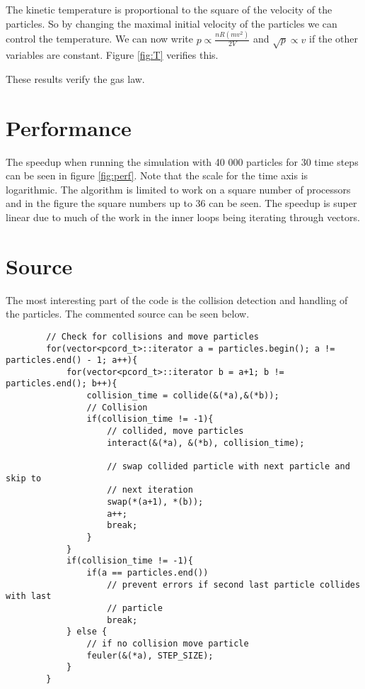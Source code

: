 \documentclass[a4paper, 12pt]{article}
\begin{document}
The kinetic temperature is proportional to the square of the velocity of the
particles. So by changing the maximal initial velocity of the particles we can
control the temperature. We can now write $p \propto \frac{nR(mv^2)}{2V}$ and
$\sqrt{p} \propto v$ if the other variables are constant. Figure \ref{fig:T}
verifies this.

These results verify the gas law.

\section{Performance}
The speedup when running the simulation with 40 000 particles for 30 time
steps can be seen in figure \ref{fig:perf}. Note that the scale for the time
axis is logarithmic. The algorithm is limited to work on a square
number of processors and in the figure the square numbers up to 36 can be seen.
The speedup is super linear due to much of the work in the inner loops being 
iterating through vectors.

\section{Source}
\label{sec:src}
The most interesting part of the code is the collision detection and handling of
the particles. The commented source can be seen below.
\begin{lstlisting}
        // Check for collisions and move particles
        for(vector<pcord_t>::iterator a = particles.begin(); a != particles.end() - 1; a++){
            for(vector<pcord_t>::iterator b = a+1; b != particles.end(); b++){
                collision_time = collide(&(*a),&(*b));
                // Collision
                if(collision_time != -1){
                    // collided, move particles
                    interact(&(*a), &(*b), collision_time);

                    // swap collided particle with next particle and skip to
                    // next iteration
                    swap(*(a+1), *(b));
                    a++;
                    break;
                }
            }
            if(collision_time != -1){
                if(a == particles.end())
                    // prevent errors if second last particle collides with last
                    // particle
                    break;
            } else {
                // if no collision move particle
                feuler(&(*a), STEP_SIZE);
            }
        }
\end{lstlisting}
\end{document}
